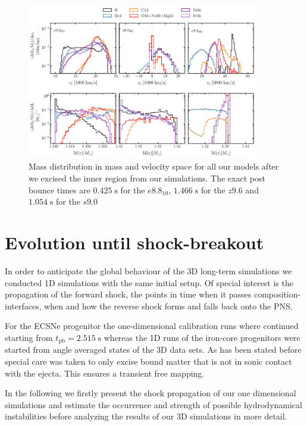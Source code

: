 \documentclass[fleqn,usenatbib]{mnras}
\begin{document}
\begin{figure}
 \centering
 \includegraphics[width=0.9\textwidth]{pic/z96_s9_e8_3d_massDis_mvr_and_masstime_0.pdf}
 \caption{Mass distribution in mass and velocity space for all our models after we excised the inner region from our simulations. The exact post bounce times are $0.425 \;\mathrm{s}$ for the $e8.8_{10}$, $1.466 \;\mathrm{s}$ for the $z9.6$ and $1.054 \;\mathrm{s}$ for the $s9.0$ }
 \label{fig:mdp first mapping}
\end{figure}

\section{Evolution until shock-breakout}
In order to anticipate the global behaviour of the 3D long-term simulations we conducted 1D simulations with the same initial setup. Of special interest is the propagation of the forward shock, the points in time when it passes composition-interfaces, when and how the reverse shock forms and falls back onto the PNS.

For the ECSNe progenitor the one-dimensional calibration runs where continued starting from $t_{\mathrm{pb}} = 2.515 \;\mathrm{s}$ whereas the 1D runs of the iron-core progenitors were started from angle averaged states of the 3D data sets. 
As has been stated before special care was taken to only excise bound matter that is not in sonic contact with the ejecta. This ensures a transient free mapping.

In the following we firstly present the shock propagation of our one dimensional simulations and estimate the occurrence and strength of possible hydrodynamical instabilities before analyzing the results of our 3D simulations in more detail.
\end{document}
